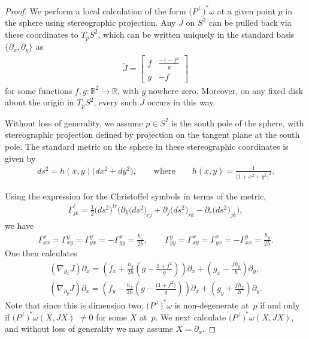 \documentclass[10pt,a4paper]{amsart}
\numberwithin{equation}{section}
\newcommand{\R}{\mathbb{R}}
\begin{document}
\begin{proof}We perform a local calculation of the form $\big(P^\perp\big)^*\omega$ at a given point $p$ in the sphere using stereographic projection. Any $J$ on $S^2$ can be pulled back via these coordinates to $T_pS^2$, which can be written uniquely in the standard basis $\{\partial_x , \partial_y\}$ as
\begin{gather*}
\tilde J=
\begin{bmatrix}
f & \frac{-1-f^2}{g}\\
g & -f
\end{bmatrix}
\end{gather*}
for some functions $f,g\colon \R^2 \to \R$, with $g$ nowhere zero. Moreover, on any fixed disk about the origin in $T_pS^2$, every such $\tilde J$ occurs in this way.

Without loss of generality, we assume $p\in S^2$ is the south pole of the sphere, with stereographic projection defined by projection on the tangent plane at the south pole. The standard metric on the sphere in these stereographic coordinates is given by
\begin{gather*}
ds^2 = h(x,y) \big(dx^2 + dy^2\big), \qquad \textrm{where} \qquad h(x,y) = \frac{1}{\big(1+x^2 +y^2\big)^2}.
\end{gather*}

Using the expression for the Christoffel symbols in terms of the metric,
\begin{gather*}
\Gamma_{jk}^\ell = \frac 1 2 \big(ds^2\big)^{lr} \big( \partial_k \big(ds^2\big)_{rj} + \partial_j \big(ds^2\big)_{rk} - \partial_r \big(ds^2\big)_{jk} \big),
\end{gather*}
we have
\begin{gather*}
\Gamma_{xx}^x = \Gamma_{xy}^y = \Gamma_{yx}^y = - \Gamma_{yy}^x = \frac{h_x}{2h}, \qquad
\Gamma_{yy}^y = \Gamma_{xy}^x = \Gamma_{yx}^x = - \Gamma_{xx}^y = \frac{h_y}{2h}.
\end{gather*}
One then calculates
\begin{gather}
( \nabla_{\partial_x} J ) \partial_x= \left(f_x + \frac{h_y}{2h} \left( g- \frac{1+f^2}{g} \right) \right) \partial_x +
\left(g_x - \frac{f h_y}{h}\right) \partial_y, \label{eqn;NJ1} \\
( \nabla_{\partial_y} J ) \partial_x = \left(f_y - \frac{h_x}{2h} \left( g - \frac{ \big(1+f^2 \big) }{g} \right) \right) \partial_x + \left(g_y + \frac{f h_x}{h}\right) \partial_y. \label{eqn;NJ2}
\end{gather}
Note that since this is dimension two, $\big(P^\perp\big)^*\!\omega$ is non-degenerate at~$p$ if and only if $\big(P^\perp\big)^*\!\omega(X,JX)\!$ $\neq 0$ for some $X$ at~$p$. We next calculate $\big(P^\perp\big)^*\omega(X,JX)$, and without loss of generality we may assume $X= \partial_x$.


\end{proof}
\end{document}
